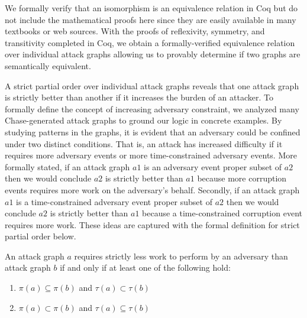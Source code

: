 \documentclass[runningheads]{llncs}
\theoremstyle{definition}
\newcommand{\squash}{\itemsep=0pt\parskip=0pt}
\begin{document}
\noindent We formally verify that an isomorphism is an equivalence relation in Coq but do not include the mathematical proofs here since they are easily available in many textbooks or web sources. With the proofs of reflexivity, symmetry, and transitivity completed in Coq, we obtain a formally-verified equivalence relation over individual attack graphs allowing us to provably determine if two graphs are semantically equivalent.


A strict partial order over individual attack graphs reveals that one attack graph is strictly better than another if it increases the burden of an attacker. To formally define the concept of increasing adversary constraint, we analyzed many Chase-generated attack graphs to ground our logic in concrete examples. By studying patterns in the graphs, it is evident that an adversary could be confined under two distinct conditions. That is, an attack has increased difficulty if it requires more adversary events or more time-constrained adversary events. More formally stated, if an attack graph $a1$ is an adversary event proper subset of $a2$ then we would conclude $a2$ is strictly better than $a1$ because more corruption events requires more work on the adversary's behalf. Secondly, if an attack graph $a1$ is a time-constrained adversary event proper subset of $a2$ then we would conclude $a2$ is strictly better than $a1$ because a time-constrained corruption event requires more work. These ideas are captured with the formal definition for strict partial order below.

\begin{definition}
  An attack graph $a$ requires strictly less work to perform by an adversary than attack graph $b$ if and only if at least one of the following hold: 
\begin{enumerate}
  \squash
  \item $\pi(a) \subseteq \pi(b)$ and $\tau(a) \subset \tau(b)$
  \item $\pi(a) \subset \pi(b)$ and $\tau(a) \subseteq \tau(b)$
\end{enumerate}
\end{definition}
\end{document}
